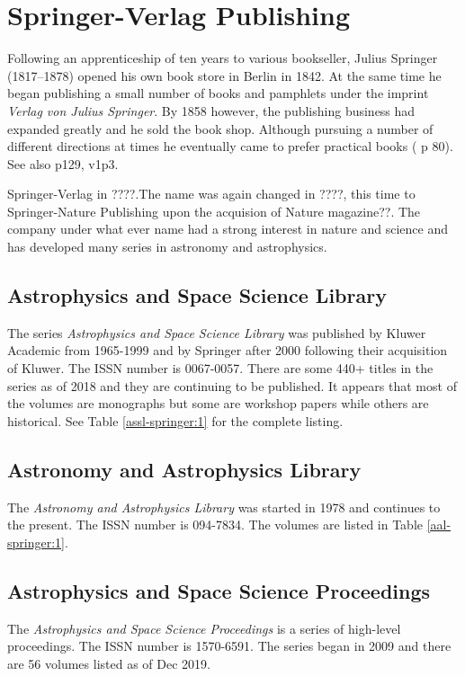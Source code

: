 \section{Springer-Verlag Publishing}

Following an apprenticeship of ten years to various bookseller, Julius
Springer (1817--1878) opened his own book store in Berlin in 1842. At
the same time he began publishing a small number of books and pamphlets
under the imprint {\itshape Verlag von Julius Springer}.  By 1858 however,
the publishing business had expanded greatly and he sold the book
shop. Although pursuing a number of different directions at times he
eventually came to prefer practical books (\cite{Sarkowski1996} p 80).
See also p129, v1p3.

Springer-Verlag in ????.The name was again changed in ????, this time
to Springer-Nature Publishing upon the acquision of Nature magazine??.
The company under what ever name had a strong interest in nature and
science and has developed many series in astronomy and astrophysics.

\subsection{Astrophysics and Space Science Library}

The series {\itshape Astrophysics and Space Science Library} was published
by Kluwer Academic from 1965-1999 and by Springer after 2000 following
their acquisition of Kluwer.  The ISSN number is 0067-0057. There are
some 440+ titles in the series as of 2018 and they are continuing to
be published.  It appears that most of the volumes are monographs but
some are workshop papers while others are historical. See Table
\ref{assl-springer:1} for the complete listing.

\subsection{Astronomy and Astrophysics Library}
  
The {\itshape Astronomy and Astrophysics Library} was started in 1978 and
continues to the present. The ISSN number is 094-7834. The volumes are
listed in Table \ref{aal-springer:1}.

\subsection{Astrophysics and Space Science Proceedings}

The {\itshape Astrophysics and Space Science Proceedings} is a series
of high-level proceedings.  The ISSN number is 1570-6591.  The series
began in 2009 and there are 56 volumes listed as of Dec 2019.
